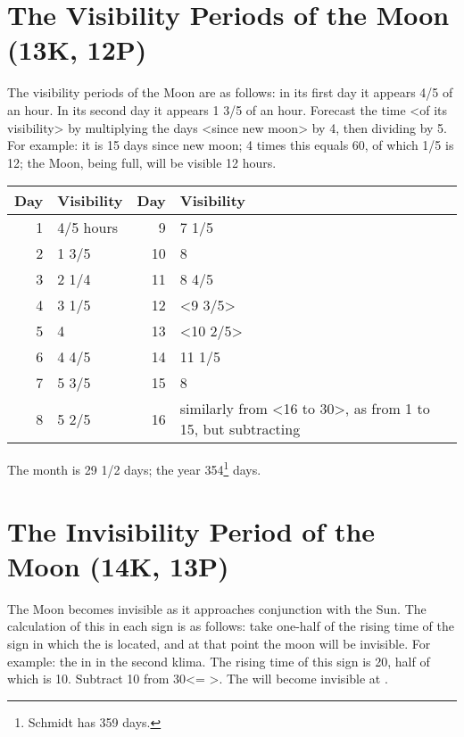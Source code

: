 \section{The Visibility Periods of the Moon (13K, 12P)}
The visibility periods of the Moon are as follows: in its first day it appears 4/5 of an hour. In its second day it appears 1 3/5 of an hour. Forecast the time <of its visibility> by multiplying the days <since new moon> by 4, then dividing by 5. For example: it is 15 days since new moon; 4 times this equals 60, of which 1/5 is 12; the Moon, being full, will be visible 12 hours.

\begin{table}[ht]
\begin{center}
\begin{tabularx}{\textwidth}	{| r | l | r | X |}
\hline
Day & Visibility & Day & Visibility \\
\hline
1	& 4/5 hours	& 9		& 7 1/5	\\
2	& 1 3/5	  	& 10	& 8			\\	
3	& 2 1/4		& 11	& 8 4/5	\\
4	& 3 1/5		& 12	& <9 3/5>	\\
5	& 4				& 13	& <10 2/5> \\
6	& 4 4/5		& 14	& 11 1/5	\\
7	& 5 3/5		& 15 	& 8			\\
8	& 5 2/5		& 16	& similarly from <16 to 30>, as
							  from 1 to 15, but subtracting \\				\hline
\end{tabularx}
\end{center}
\end{table}

The month is 29 1/2 days; the year 354\footnote{Schmidt has 359 days.} days.

\newpage
\section{The Invisibility Period of the Moon (14K, 13P)}
The Moon becomes invisible as it approaches conjunction with the Sun. The calculation of this in each sign is as follows: take one-half of the rising time of the sign in which the \Sun\xspace is located, and at that point the moon will be invisible. For example: the \Sun\xspace in \Aries\xspace in the second klima. The rising time of this sign is 20, half of which is 10. Subtract 10 from 30\deg\xspace <\Aries\xspace 1\deg\xspace = \Pisces\xspace 30\deg>. The \Moon\xspace will become invisible at \Pisces\xspace 20\deg.

